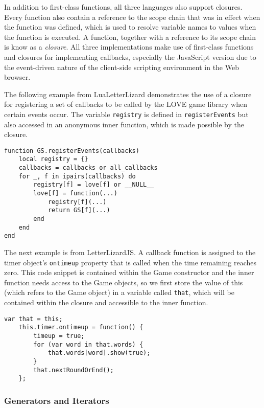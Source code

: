 In addition to first-class functions, all three languages also support closures.
Every function also contain a reference to the scope chain that was
in effect when the function was defined, which is used to resolve variable
names to values when the function is executed. A function, together with a
reference to its scope chain is know as a \emph{closure}.
All three implementations make use of first-class functions and closures for 
implementing callbacks, especially the JavaScript version due to the 
event-driven nature of the client-side scripting environment in the Web browser.

The following example from LuaLetterLizard demonstrates the use of a closure
for registering a set of callbacks to be called by the LOVE game library when
certain events occur. The variable \texttt{registry} is defined in \texttt{registerEvents}
but also accessed in an anonymous inner function, which is made possible by the closure.

\begin{lstlisting}[language={[5.2]Lua},caption=A closure in Lua.]
function GS.registerEvents(callbacks)
	local registry = {}
	callbacks = callbacks or all_callbacks
	for _, f in ipairs(callbacks) do
		registry[f] = love[f] or __NULL__
		love[f] = function(...)
			registry[f](...)
			return GS[f](...)
		end
	end
end
\end{lstlisting}

The next example is from LetterLizardJS. A callback function is assigned to the
timer object's \texttt{ontimeup} property that is called when the time remaining
reaches zero. This code snippet is contained within the Game constructor and the
inner function needs access to the Game objects, so we first store the value of this
(which refers to the Game object) in a variable called \texttt{that}, which will be
contained within the closure and accessible to the inner function.

\begin{lstlisting}[caption=A closure in JavaScript.]
	var that = this;
	this.timer.ontimeup = function() {
		timeup = true;
		for (var word in that.words) {
			that.words[word].show(true);
		}
		that.nextRoundOrEnd();
	};
\end{lstlisting}

\subsubsection{Generators and Iterators}

